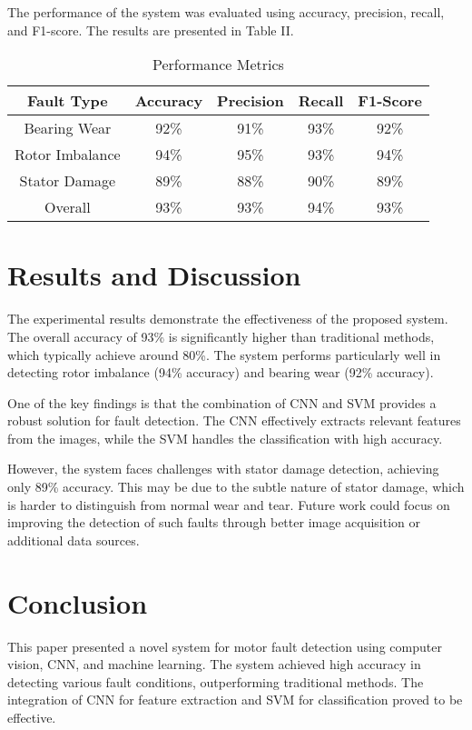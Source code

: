 \documentclass[conference]{IEEEtran}
\begin{document}
The performance of the system was evaluated using accuracy, precision, recall, and F1-score. The results are presented in Table II.

\begin{table}[H]
    \caption{Performance Metrics}
    \label{tab:metrics}
    \centering
    \begin{tabular}{|c|c|c|c|c|}
        \hline
        Fault Type & Accuracy & Precision & Recall & F1-Score \\
        \hline
        Bearing Wear & 92\% & 91\% & 93\% & 92\% \\
        \hline
        Rotor Imbalance & 94\% & 95\% & 93\% & 94\% \\
        \hline
        Stator Damage & 89\% & 88\% & 90\% & 89\% \\
        \hline
        Overall & 93\% & 93\% & 94\% & 93\% \\
        \hline
    \end{tabular}
\end{table}

\section{Results and Discussion}

The experimental results demonstrate the effectiveness of the proposed system. The overall accuracy of 93\% is significantly higher than traditional methods, which typically achieve around 80\%. The system performs particularly well in detecting rotor imbalance (94\% accuracy) and bearing wear (92\% accuracy).

One of the key findings is that the combination of CNN and SVM provides a robust solution for fault detection. The CNN effectively extracts relevant features from the images, while the SVM handles the classification with high accuracy.

However, the system faces challenges with stator damage detection, achieving only 89\% accuracy. This may be due to the subtle nature of stator damage, which is harder to distinguish from normal wear and tear. Future work could focus on improving the detection of such faults through better image acquisition or additional data sources.

\section{Conclusion}

This paper presented a novel system for motor fault detection using computer vision, CNN, and machine learning. The system achieved high accuracy in detecting various fault conditions, outperforming traditional methods. The integration of CNN for feature extraction and SVM for classification proved to be effective.
\end{document}
